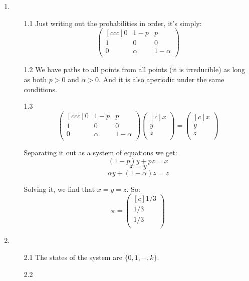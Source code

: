 \begin{enumerate}
  \item
  \begin{enumerate}   
  \item [1.1] Just writing out the probabilities in order, it's simply:
    $$
      \begin{pmatrix}[ccc]
        0 & 1-p & p\\
        1 & 0   & 0\\
        0 & \alpha & 1-\alpha\\
      \end{pmatrix}
    $$

  \item [1.2] We have paths to all points from all points (it is irreducible) as long as both $p > 0$ and $\alpha > 0$. And it is also aperiodic under the same conditions.
  \item [1.3]
    $$
      \begin{pmatrix}[ccc]
        0 & 1-p & p\\
        1 & 0   & 0\\
        0 & \alpha & 1-\alpha\\
      \end{pmatrix}
      \begin{pmatrix}[c]
        x\\
        y\\
        z\\
      \end{pmatrix}
      = 
      \begin{pmatrix}[c]
        x\\
        y\\
        z\\
      \end{pmatrix}
    $$

    Separating it out as a system of equations we get:
    $$(1-p)y + pz = x$$
    $$x = y$$
    $$\alpha y + (1 - \alpha)z = z$$

    Solving it, we find that $x = y = z$. So:
    $$\pi =       
    \begin{pmatrix}[c]
        1/3\\
        1/3\\
        1/3\\
      \end{pmatrix}
    $$
  \end{enumerate}

  \item
    \begin{enumerate}
      \item [2.1] The states of the system are $\{0, 1, \cdots, k\}$.
      \item [2.2] 


\end{enumerate}
\end{enumerate}
